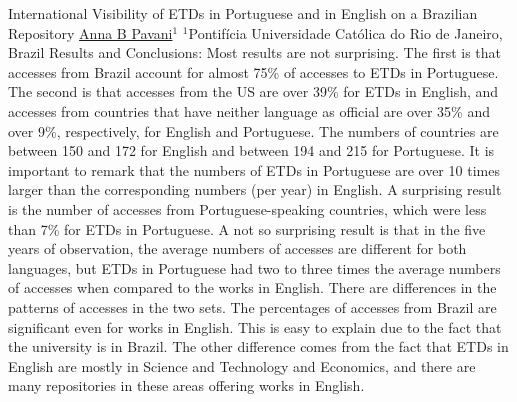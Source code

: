 \begin{abstract_online}{International Visibility of ETDs in Portuguese and in English on a Brazilian Repository}{%
    \underline{Anna B Pavani}$^{1}$}{%
    }{%
    $^1$Pontifícia Universidade Católica do Rio de Janeiro, Brazil}
Results and Conclusions: Most results are not surprising. The first is that accesses from Brazil account for almost 75\% of accesses to ETDs in Portuguese. The second is that accesses from the US are over 39\% for ETDs in English, and accesses from countries that have neither language as official are over 35\% and over 9\%, respectively, for English and Portuguese. The numbers of countries are between 150 and 172 for English and between 194 and 215 for Portuguese. It is important to remark that the numbers of ETDs in Portuguese are over 10 times larger than the corresponding numbers (per year) in English. A surprising result is the number of accesses from Portuguese-speaking countries, which were less than 7\% for ETDs in Portuguese. A not so surprising result is that in the five years of observation, the average numbers of accesses are different for both languages, but ETDs in Portuguese had two to three times the average numbers of accesses when compared to the works in English. There are differences in the patterns of accesses in the two sets. The percentages of accesses from Brazil are significant even for works in English. This is easy to explain due to the fact that the university is in Brazil. The other difference comes from the fact that ETDs in English are mostly in Science and Technology and Economics, and there are many repositories in these areas offering works in English.

\end{abstract_online}


